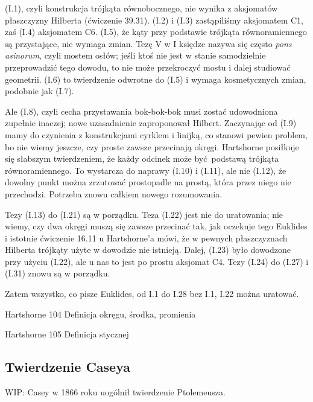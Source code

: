 {(I.1), czyli konstrukcja trójkąta równobocznego, nie wynika z aksjomatów płaszczyzny Hilberta (ćwiczenie 39.31).
(I.2) i (I.3) zastąpiliśmy aksjomatem C1, zaś (I.4) aksjomatem C6.
(I.5), że kąty przy podstawie trójkąta równoramiennego są przystające, nie wymaga zmian.
Tezę V w I księdze nazywa się często \emph{pons asinorum}, czyli mostem osłów; jeśli ktoś nie jest w stanie samodzielnie przeprowadzić tego dowodu, to nie może przekroczyć mostu i dalej studiować geometrii.
%
%
(I.6) to twierdzenie odwrotne do (I.5) i wymaga kosmetycznych zmian, podobnie jak (I.7).

Ale (I.8), czyli cecha przystawania bok-bok-bok musi zostać udowodniona zupełnie inaczej; nowe uzasadnienie zaproponował Hilbert.
Zaczynając od (I.9) mamy do czynienia z konstrukcjami cyrklem i linijką, co stanowi pewien problem, bo nie wiemy jeszcze, czy proste zawsze przecinają okręgi.
Hartshorne posiłkuje się słabszym twierdzeniem, że każdy odcinek może być podstawą trójkąta równoramiennego.
To wystarcza do naprawy (I.10) i (I.11), ale nie (I.12), że dowolny punkt można zrzutować prostopadle na prostą, która przez niego nie przechodzi.
Potrzeba znowu całkiem nowego rozumowania.

Tezy (I.13) do (I.21) są w porządku.
Teza (I.22) jest nie do uratowania; nie wiemy, czy dwa okręgi muszą się zawsze przecinać tak, jak oczekuje tego Euklides i istotnie ćwiczenie 16.11 u Hartshorne'a mówi, że w pewnych płaszczyznach Hilberta trójkąty użyte w dowodzie nie istnieją.
Dalej, (I.23) było dowodzone przy użyciu (I.22), ale u nas to jest po prostu aksjomat C4.
Tezy (I.24) do (I.27) i (I.31) znowu są w porządku.

Zatem wszystko, co pisze Euklides, od I.1 do I.28 bez I.1, I.22 można uratować.

Hartshorne 104
Definicja okręgu, środka, promienia

Hartshorne 105
Definicja stycznej


}



\color{red}

\subsection{Twierdzenie Caseya}
WIP: Casey w 1866 roku uogólnił twierdzenie Ptolemeusza.

\color{black}

